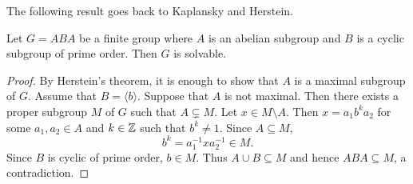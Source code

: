 The following result goes back to
Kaplansky and 
Herstein.

\begin{corollary}
    Let $G=ABA$ be a finite group where $A$ is an abelian subgroup and $B$ is a cyclic subgroup of prime order. Then $G$ is solvable. 
\end{corollary}

\begin{proof}
    By Herstein's theorem, it is enough to show
    that $A$ is a maximal subgroup of $G$. Assume that 
    $B=\langle b\rangle$. 
    Suppose that $A$ is not maximal. Then there
    exists a proper subgroup $M$ of $G$ such that 
    $A\subsetneq M$. Let $x\in M\setminus A$. Then 
    $x=a_1b^ka_2$ for some $a_1,a_2\in A$ and $k\in\mathbb{Z}$ such that $b^k\ne 1$. Since $A\subseteq M$, 
    \[
    b^k=a_1^{-1}xa_2^{-1}\in M.
    \]
    Since $B$ is cyclic of prime order, $b\in M$. Thus 
    $A\cup B\subseteq M$ and hence $ABA\subseteq M$, a contradiction. 
\end{proof}